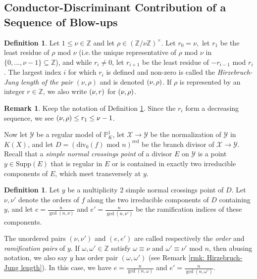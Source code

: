 \documentclass[12pt]{amsart}
\numberwithin{equation}{section}
\theoremstyle{definition}
\newtheorem{remark}[equation]{Remark}
\newtheorem{defn}[equation]{Definition}
\newcommand{\Z}{\mathbb Z}
\renewcommand{\P}{\mathbb P}
\newcommand{\X}{\mathcal{X}}
\newcommand{\Y}{\mathcal{Y}}
\newcommand{\tx}[1]{\text{#1}}
\let\L\relax
\DeclareMathOperator{\L}{L}
\begin{document}
\subsection{Conductor-Discriminant Contribution of a Sequence of Blow-ups}

\begin{defn}\label{dfn: Hirzebruch-Jung length of a pair}\cite[Definition 7.2]{Part1}
    Let $1\leq \nu\in\Z$ and let $\rho\in(\Z/\nu\Z)^\times$. Let $r_0=\nu,$ let $r_1$ be the least residue of $\rho$ mod $\nu$ (i.e.\,the unique representative of $\rho$ mod $\nu$ in $\{0,...,\nu-1\}\subseteq\Z$), and while $r_i\neq 0$, let $r_{i+1}$ be the least residue of $-r_{i-1}$ mod $r_i$.
    The largest index $i$ for which $r_i$ is defined and non-zero is called the \textit{Hirzebruch-Jung length of the pair $(\nu,\rho)$} and is denoted $\L(\nu,\rho)$. If $\rho$ is represented by an integer $r\in\Z$, we also write $\L(\nu,r)$ for $\L(\nu,\rho)$.
\end{defn}

\begin{remark}\label{rmk: L bound}
    Keep the notation of Definition \ref{dfn: Hirzebruch-Jung length of a pair}. Since the $r_i$ form a decreasing sequence, we see $\L(\nu,\rho)\leq r_1\leq \nu-1$.
\end{remark}

Now let $\Y$ be a regular model of $\P^1_K$, let $\X\to\Y$ be the normalization of $\Y$ in  $K(X)$, and let $D=(\tx{div}_0(f)\tx{ mod }n)^\tx{red}$ be the branch divisor of $\X\to\Y$. Recall that a \textit{simple normal crossings point} of a divisor $E$ on $\Y$ is a point $y\in\tx{Supp}(E)$ that is regular in $E$ or is contained in exactly two irreducible components of $E$, which meet transversely at $y$.
    
\begin{defn}\label{dfn: Hirzebruch-Jung length of a point}   
    Let $y$ be a multiplicity $2$ simple normal crossings point of $D$. Let $\nu,\nu'$ denote the orders of $f$ along the two irreducible components of $D$ containing $y$, and let $e=\frac{n}{\gcd(n,\nu)}$ and $e'=\frac{n}{\gcd(n,\nu')}$ be the ramification indices of these components.
    
    The unordered pairs $(\nu,\nu')$ and $(e,e')$ are called respectively the \textit{order} and \textit{ramification pairs} of $y$. If $\omega,\omega'\in\Z$ satisfy $\omega\equiv \nu$ and $\omega'\equiv\nu'$ mod $n$, then abusing notation, we also say $y$ has order pair $(\omega,\omega')$ (see Remark \ref{rmk: Hirzebruch-Jung length}). In this case, we have $e=\frac{n}{\gcd(n,\omega)}$ and $e'=\frac{n}{\gcd(n,\omega')}$.
\end{defn}
\end{document}
